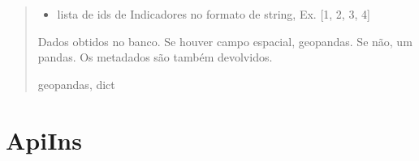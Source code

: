 \documentclass[letterpaper,10pt,brazil]{sphinxmanual}
\begin{document}
\begin{fulllineitems}
\begin{fulllineitems}
\begin{quote}
\begin{description}
\begin{itemize}
\item {} 
\sphinxAtStartPar
{} \textendash{} lista de ids de Indicadores no formato de string, Ex. {[}1, 2, 3, 4{]}

\end{itemize}

\sphinxAtStartPar
Dados obtidos no banco. Se houver campo espacial, geopandas. Se não, um pandas. Os metadados são também devolvidos.

\sphinxAtStartPar
geopandas, dict

\end{description}\end{quote}

\end{fulllineitems}


\end{fulllineitems}


\sphinxstepscope


\section{ApiIns}
\label{\detokenize{api_gen/apiModulo.api_insercao:apiins}}\label{\detokenize{api_gen/apiModulo.api_insercao::doc}}
\end{document}
